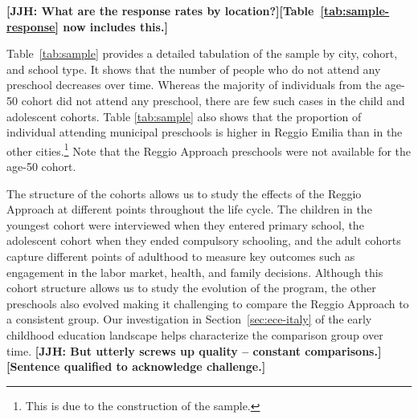 \textbf{[JJH: What are the response rates by location?]}\textbf{[Table~\ref{tab:sample-response} now includes this.]}

Table~\ref{tab:sample} provides a detailed tabulation of the sample by city, cohort, and school type. It shows that the number of people who do not attend any preschool decreases over time. Whereas the majority of individuals from the age-50 cohort did not attend any preschool, there are few such cases in the child and adolescent cohorts. Table \ref{tab:sample} also shows that the proportion of individual attending municipal preschools is higher in Reggio Emilia than in the other cities.\footnote{This is due to the construction of the sample.} Note that the Reggio Approach preschools were not available for the age-50 cohort.

\begin{table}[H]
\centering
{}
\end{table}

The structure of the cohorts allows us to study the effects of the Reggio Approach at different points throughout the life cycle. The children in the youngest cohort were interviewed when they entered primary school, the adolescent cohort when they ended compulsory schooling, and the adult cohorts capture different points of adulthood to measure key outcomes such as engagement in the labor market, health, and family decisions. Although this cohort structure allows us to study the evolution of the program, the other preschools also evolved making it challenging to compare the Reggio Approach to a consistent group. Our investigation in Section~\ref{sec:ece-italy} of the early childhood education landscape helps characterize the comparison group over time. \textbf{[JJH: But utterly screws up quality -- constant comparisons.]}\textbf{[Sentence qualified to acknowledge challenge.]}

